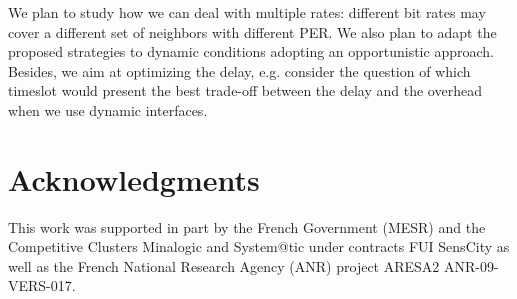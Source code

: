 \documentclass[twoside]{article}
\begin{document}
We plan to study how we can deal with multiple rates: different bit rates may
cover a different set of neighbors with different PER.  
We also plan to adapt the proposed strategies to dynamic conditions adopting an opportunistic approach.
Besides, we aim at optimizing the delay, e.g. consider the question of which
timeslot would present the best trade-off between the delay and the overhead
when we use dynamic interfaces. 



\section*{Acknowledgments}

This work was supported in part by the French Government (MESR) and the Competitive Clusters Minalogic and System@tic under contracts FUI SensCity as well as the French National Research Agency (ANR) project ARESA2 ANR-09-VERS-017. 






\end{document}
